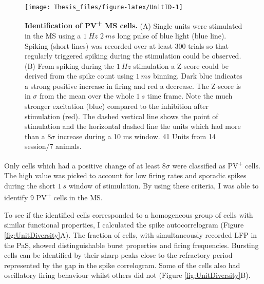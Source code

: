 \documentclass[
  12pt,
  a4paper,
  openany]{book}
\begin{document}
\begin{figure}[htb]

{\centering \texttt{[image: Thesis\_files/figure-latex/UnitID-1]} 

}

\caption[Identification of PV\textsuperscript{+} MS cells]{\textbf{Identification of PV\textsuperscript{+} MS cells.} (A) Single units were stimulated in the MS using a \(1\ Hz\) \(2\ ms\) long pulse of blue light (blue line). Spiking (short lines) was recorded over at least \(300\) trials so that regularly triggered spiking during the stimulation could be observed. (B) From spiking during the \(1\ Hz\) stimulation a Z-score could be derived from the spike count using \(1\ ms\) binning. Dark blue indicates a strong positive increase in firing and red a decrease. The Z-score is in \(\sigma\) from the mean over the whole \(1\ s\) time frame. Note the much stronger excitation (blue) compared to the inhibition after stimulation (red). The dashed vertical line shows the point of stimulation and the horizontal dashed line the units which had more than a \(8\sigma\) increase during a 10 ms window. 41 Units from 14 session/7 animals.}\label{fig:UnitID}
\end{figure}

\noindent Only cells which had a positive change of at least \(8\sigma\) were classified as PV\textsuperscript{+} cells. The high value was picked to account for low firing rates and sporadic spikes during the short \(1\ s\) window of stimulation. By using these criteria, I was able to identify \(9\) PV\textsuperscript{+} cells in the MS.

To see if the identified cells corresponded to a homogeneous group of cells with similar functional properties, I calculated the spike autocorrelogram (Figure \ref{fig:UnitDiversity}A). The fraction of cells, with simultaneously recorded LFP in the PaS, showed distinguishable burst properties and firing frequencies. Bursting cells can be identified by their sharp peaks close to the refractory period represented by the gap in the spike correlogram. Some of the cells also had oscillatory firing behaviour whilst others did not (Figure \ref{fig:UnitDiversity}B).
\end{document}
